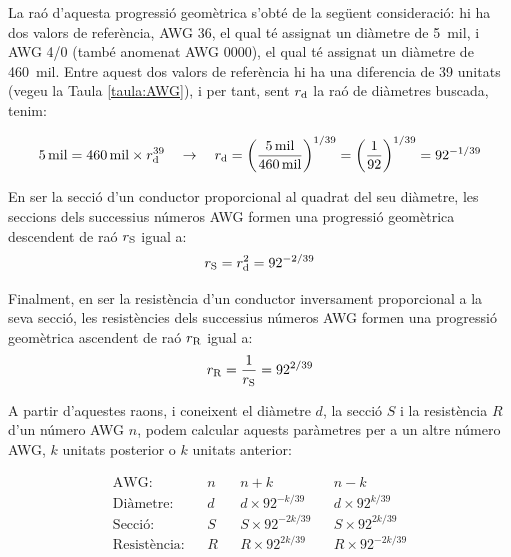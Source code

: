 La ra\'{o} d'aquesta progressi\'{o} geom\`{e}trica s'obt\'{e} de la seg\"{u}ent consideraci\'{o}: hi ha dos valors de refer\`{e}ncia, AWG 36, el qual t\'{e} assignat un di\`{a}metre de \SI{5}{mil}, i AWG 4/0 (tamb\'{e} anomenat AWG 0000), el qual t\'{e} assignat un di\`{a}metre de \SI{460}{mil}. Entre aquest dos valors de refer\`{e}ncia hi ha una diferencia de 39 unitats (vegeu la Taula \vref{taula:AWG}), i per tant, sent $r_\mathrm{d}$ la ra\'{o} de di\`{a}metres buscada, tenim:

\begin{equation}
   \SI{5}{mil} = \SI{460}{mil} \times r_\mathrm{d}^{39} \quad \rightarrow \quad r_\mathrm{d} = \left( \frac{\SI{5}{mil}}{\SI{460}{mil}} \right)^{1/39} = \left( \frac{1}{92} \right)^{1/39} = 92^{-1/39}
\end{equation}

En ser la secci\'{o} d'un conductor proporcional al quadrat del seu di\`{a}metre, les seccions dels successius n\'{u}meros AWG formen una progressi\'{o} geom\`{e}trica  descendent de ra\'{o} $r_\mathrm{S}$ igual a: \begin{equation}
   r_\mathrm{S} = r_\mathrm{d}^2 = 92^{-2/39}
\end{equation}

Finalment, en ser la resist\`{e}ncia d'un conductor inversament proporcional a la seva secci\'{o}, les resist\`{e}ncies dels successius n\'{u}meros AWG formen una progressi\'{o} geom\`{e}trica ascendent de ra\'{o} $r_\mathrm{R}$ igual a:
\begin{equation}
   r_\mathrm{R} = \frac{1}{r_\mathrm{S}} = 92^{2/39}
\end{equation}

A partir d'aquestes raons, i coneixent el di\`{a}metre $d$, la secci\'{o} $S$ i la resist\`{e}ncia $R$ d'un n\'{u}mero AWG $n$, podem calcular aquests par\`{a}metres per a un altre n\'{u}mero AWG, $k$ unitats posterior o $k$ unitats anterior:

\begin{equation}
   \begin{array}{rllllll}
     \text{AWG:}         & & n & & n+k                & & n-k \\
     \text{Di\`{a}metre:}    & & d & & d\times 92^{-k/39}  & & d\times 92^{k/39} \\
     \text{Secci\'{o}:}      & & S & & S\times 92^{-2k/39} & & S\times 92^{2k/39} \\
     \text{Resist\`{e}ncia:} & & R & & R\times 92^{2k/39}  & & R\times 92^{-2k/39}
   \end{array}
\end{equation}

